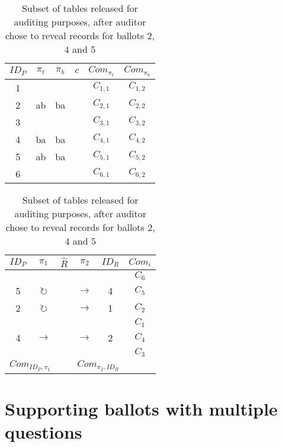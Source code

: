 \begin{table}
	\centering
	\begin{subtable}{.5\linewidth}
		\begin{tabular}{|c|c|c|c|c|c|}
			\hline
			$ID_P$ & $\pi_{t}$ & $\pi_{b}$ & $c$ & $Com_{\pi_{t}}$ & $Com_{\pi_{b}}$ \\
			\hline
			1 & & & & $C_{1, 1}$ & $C_{1, 2}$ \\
			2 & ab & ba & & $C_{2, 1}$ & $C_{2, 2}$ \\
			3 & & & & $C_{3, 1}$ & $C_{3, 2}$ \\
			4 & ba & ba & & $C_{4, 1}$ & $C_{4, 2}$ \\
			5 & ab & ba & & $C_{5, 1}$ & $C_{5, 2}$ \\
			6 & & & & $C_{6, 1}$ & $C_{6, 2}$ \\
			\hline
		\end{tabular}
	\end{subtable}%
	\begin{subtable}{.5\linewidth}
		\begin{tabular}{|c|c|c|c|c|c|}
			\hline
			$ID_P$ & $\pi_1$ & $\hat{R}$ & $\pi_2$ & $ID_R$ & $Com_{i}$ \\
			\hline
			&                     & &                     &   & $C_6$ \\
			5 & $\circlearrowright$ & & $\rightarrow$       & 4 & $C_5$ \\
			2 & $\circlearrowright$ & & $\rightarrow$       & 1 & $C_2$ \\
			&                     & &                     &   & $C_1$ \\
			4 & $\rightarrow$       & & $\rightarrow$       & 2 & $C_4$ \\
			&                     & &                     &   & $C_3$ \\
			\hline
			\multicolumn{2}{|c|}{$Com_{ID_P, \pi_1}$} &   & \multicolumn{2}{c|}{$Com_{\pi_2, ID_R}$} & \\
			\hline
		\end{tabular}
	\end{subtable}
	\caption{Subset of tables released for auditing purposes, after auditor chose to reveal records for ballots $2$, $4$ and $5$}
	\label{tbl:setup_audit_revealed}
\end{table}

\section{Supporting ballots with multiple questions}

